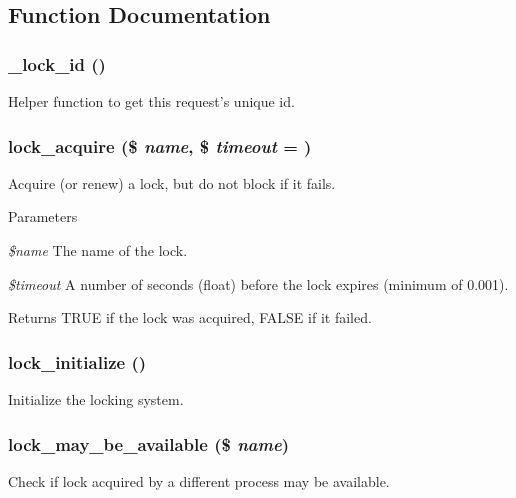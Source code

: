 \subsection{Function Documentation}
\hypertarget{group__lock_ga22f64c6b65bc54d5f8f981559b0cdf04}{
\subsubsection[{\_\-lock\_\-id}]{\setlength{\rightskip}{0pt plus 5cm}\_\-lock\_\-id ()}}
\label{group__lock_ga22f64c6b65bc54d5f8f981559b0cdf04}
Helper function to get this request's unique id. \hypertarget{group__lock_gac67a4b1061491f7a869646f47b66e998}{
\subsubsection[{lock\_\-acquire}]{\setlength{\rightskip}{0pt plus 5cm}lock\_\-acquire (\$ {\em name}, \/  \$ {\em timeout} = {})}}
\label{group__lock_gac67a4b1061491f7a869646f47b66e998}
Acquire (or renew) a lock, but do not block if it fails.


\begin{DoxyParams}{Parameters}
\item[{\em \$name}]The name of the lock. \item[{\em \$timeout}]A number of seconds (float) before the lock expires (minimum of 0.001).\end{DoxyParams}
\begin{DoxyReturn}{Returns}
TRUE if the lock was acquired, FALSE if it failed. 
\end{DoxyReturn}
\hypertarget{group__lock_ga8e0cf09d86196c0a26b50df3567108a4}{
\subsubsection[{lock\_\-initialize}]{\setlength{\rightskip}{0pt plus 5cm}lock\_\-initialize ()}}
\label{group__lock_ga8e0cf09d86196c0a26b50df3567108a4}
Initialize the locking system. \hypertarget{group__lock_ga095b65838e63b109f52ff6d8c00d8963}{
\subsubsection[{lock\_\-may\_\-be\_\-available}]{\setlength{\rightskip}{0pt plus 5cm}lock\_\-may\_\-be\_\-available (\$ {\em name})}}
\label{group__lock_ga095b65838e63b109f52ff6d8c00d8963}
Check if lock acquired by a different process may be available.

